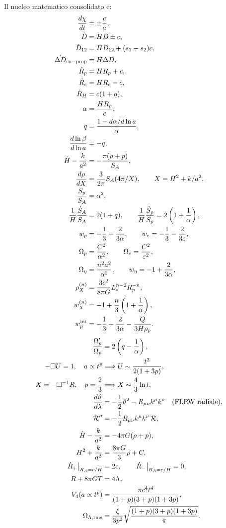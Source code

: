 \documentclass[11pt,a4paper]{article}
\begin{document}
Il nucleo matematico consolidato e:
\begin{align}
\frac{d\chi}{dt}&=\pm\frac ca,\\
\dot D&=HD\pm c,\\
\dot D_{12}&=HD_{12}+(s_1-s_2)c,\\
\dot{\Delta D}_{\rm co-prop}&=H\Delta D,\\
\dot R_p&=HR_p+c,\\
\dot R_e&=HR_e-c,\\
\dot R_H&=c(1+q),\\
\alpha&=\frac{HR_p}{c},\\
q&=\frac{1-d\alpha/d\ln a}{\alpha},\\
\frac{d\ln\beta}{d\ln a}&=-q,\\
\dot H-\frac{k}{a^2}&=-\frac{\pi(\rho+p)}{S_A},\\
\frac{d\rho}{dX}&=\frac{3}{2\pi}S_A(4\pi/X),\qquad X=H^2+k/a^2,\\
\frac{S_p}{S_A}&=\alpha^2,\\
\frac{1}{H}\frac{\dot S_A}{S_A}&=2(1+q),\qquad
\frac{1}{H}\frac{\dot S_p}{S_p}=2\left(1+\frac1\alpha\right),\\
w_p&=-\frac13+\frac{2}{3\alpha},\qquad
w_e=-\frac13-\frac{2}{3\varepsilon},\\
\Omega_p&=\frac{C^2}{\alpha^2},\qquad
\Omega_e=\frac{C^2}{\varepsilon^2},\\
\Omega_\eta&=\frac{n^2a^2}{\alpha^2},\qquad
w_\eta=-1+\frac{2}{3\alpha},\\
\rho_X^{(n)}&=\frac{3c^2}{8\pi G}L_*^{n-2}R_p^{-n},\\
w_X^{(n)}&=-1+\frac n3\left(1+\frac1\alpha\right),\\
w_p^{\rm int}&=-\frac13+\frac{2}{3\alpha}-\frac{Q}{3H\rho_p}.
\end{align}
\begin{align}
\frac{\Omega_p'}{\Omega_p}&=2\left(q-\frac1\alpha\right),\\
-\Box U=1,\quad a\propto t^p&\Longrightarrow U\sim\frac{t^2}{2(1+3p)},\\
X=-\Box^{-1}R,\quad p=\frac23&\Longrightarrow X\sim\frac43\ln t,\\
\frac{d\vartheta}{d\lambda}&=-\frac12\vartheta^2-R_{\mu\nu}k^\mu k^\nu\quad(\mathrm{FLRW\ radiale}),\\
\mathcal R''&=-\frac12R_{\mu\nu}k^\mu k^\nu\,\mathcal R,\\
\dot H-\frac{k}{a^2}&=-4\pi G(\rho+p),\\
H^2+\frac{k}{a^2}&=\frac{8\pi G}{3}\rho+C,\\
\left.\dot R_+\right|_{R_A=c/H}&=2c,\qquad
\left.\dot R_-\right|_{R_A=c/H}=0,\\
R+8\pi G T&=4\Lambda,\\
V_4(a\propto t^p)&=\frac{\pi c^4t^4}{(1+p)(3+p)(1+3p)},\\
\Omega_{\Lambda,{\rm rms}}&=\frac{\xi}{3p^2}\sqrt{\frac{(1+p)(3+p)(1+3p)}{\pi}}.
\end{align}
\end{document}

